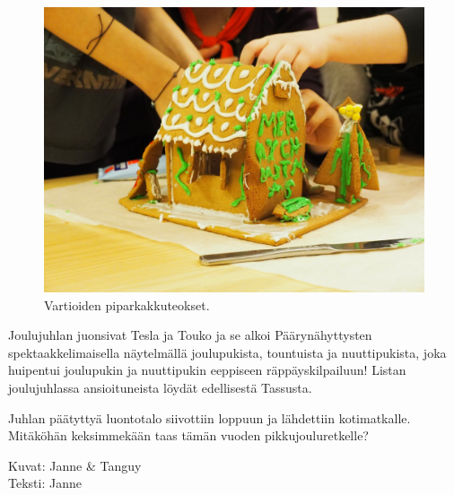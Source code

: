 \begin{multicols}{2}
\begin{figure}[p]
\vspace*{.05\textwidth}

\includegraphics[width=.475\textwidth,height=.475\textwidth,keepaspectratio]{assets/pipari5}

\caption{Vartioiden piparkakkuteokset.}
\end{figure}

Joulujuhlan juonsivat Tesla ja Touko ja se alkoi Päärynähyttysten 
spektaakkelimaisella näytelmällä joulupukista, tountuista ja nuuttipukista, 
joka huipentui joulupukin ja nuuttipukin eeppiseen räppäyskilpailuun! Listan 
joulujuhlassa ansioituneista löydät edellisestä Tassusta.

Juhlan päätyttyä luontotalo siivottiin loppuun ja lähdettiin kotimatkalle. 
Mitäköhän keksimmekään taas tämän vuoden pikkujouluretkelle?
\end{multicols}

\medskip

\noindent\null\hfill Kuvat: Janne \& Tanguy\\
\noindent\null\hfill Teksti: Janne
